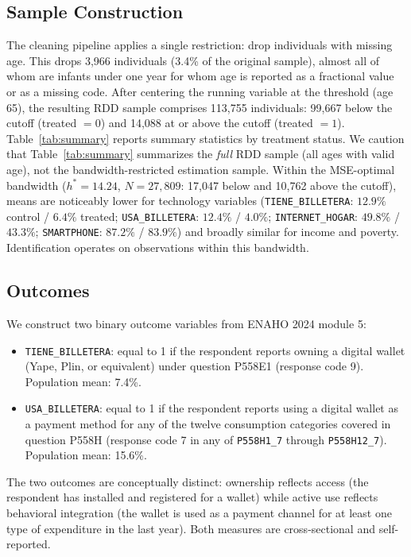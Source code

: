 \documentclass[12pt]{article}
\begin{document}
\subsection{Sample Construction}

The cleaning pipeline applies a single restriction: drop individuals with missing age. This drops 3,966 individuals (3.4\% of the original sample), almost all of whom are infants under one year for whom age is reported as a fractional value or as a missing code. After centering the running variable at the threshold (age 65), the resulting RDD sample comprises 113,755 individuals: 99,667 below the cutoff (treated $=0$) and 14,088 at or above the cutoff (treated $=1$). Table~\ref{tab:summary} reports summary statistics by treatment status. We caution that Table~\ref{tab:summary} summarizes the \emph{full} RDD sample (all ages with valid age), not the bandwidth-restricted estimation sample. Within the MSE-optimal bandwidth ($h^{\ast}\!=\!14.24$, $N\!=\!27{,}809$: 17,047 below and 10,762 above the cutoff), means are noticeably lower for technology variables (\texttt{TIENE\_BILLETERA}: $12.9\%$ control / $6.4\%$ treated; \texttt{USA\_BILLETERA}: $12.4\%$ / $4.0\%$; \texttt{INTERNET\_HOGAR}: $49.8\%$ / $43.3\%$; \texttt{SMARTPHONE}: $87.2\%$ / $83.9\%$) and broadly similar for income and poverty. Identification operates on observations within this bandwidth.

\subsection{Outcomes}

We construct two binary outcome variables from ENAHO 2024 module 5:
\begin{itemize}
    \item \texttt{TIENE\_BILLETERA}: equal to 1 if the respondent reports owning a digital wallet (Yape, Plin, or equivalent) under question P558E1 (response code 9). Population mean: 7.4\%.
    \item \texttt{USA\_BILLETERA}: equal to 1 if the respondent reports using a digital wallet as a payment method for any of the twelve consumption categories covered in question P558H (response code 7 in any of \texttt{P558H1\_7} through \texttt{P558H12\_7}). Population mean: 15.6\%.
\end{itemize}

The two outcomes are conceptually distinct: ownership reflects access (the respondent has installed and registered for a wallet) while active use reflects behavioral integration (the wallet is used as a payment channel for at least one type of expenditure in the last year). Both measures are cross-sectional and self-reported.
\end{document}

